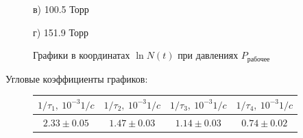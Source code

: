 \documentclass[a4paper, fontsize=12bp]{article}
\begin{document}
\begin{figure}[H]
\vfill
\begin{minipage}[h]{0.47\linewidth}
 в) 100.5 Торр \\
\end{minipage}
\hfill
\begin{minipage}[h]{0.47\linewidth}
 г) 151.9 Торр \\
\end{minipage}
\caption{Графики в координатах $\ln\! N(t)$ при давлениях $P_{\text{рабочее}}$}
\end{figure}
Угловые коэффициенты графиков:
\begin{figure}[H]
\center
\begin{tabular}{|c|c|c|c|}
\hline $1/\tau_1,\ 10^{-3} 1/c$ & $1/\tau_2,\ 10^{-3} 1/c$ & $1/\tau_3,\  10^{-3} 1/c$ & $1/\tau_4,\ 10^{-3} 1/c$ \\
\hline $2.33 \pm 0.05$ & $1.47 \pm 0.03$ & $1.14 \pm 0.03$ &  $0.74 \pm 0.02$\\\hline
	\end{tabular}
\end{figure}
\end{document}
